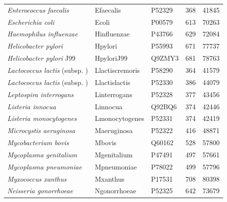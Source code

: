 \begin{table}
\begin{minipage}[c]{\textwidth}
\begin{narrow}{-1in}{-1in}
\begin{small}
\begin{tabular}{@{}llllp{.7in}@{}}
{\it Enterococcus faecalis} &  Efaecalis &     P52329 &        368 &      41845 \\

{\it Escherichia coli} &      Ecoli &     P00579 &        613 &      70263 \\

{\it Haemophilus influenzae} & Hinfluenzae &     P43766 &        629 &      72084 \\

{\it Helicobacter pylori} &    Hpylori &     P55993 &        671 &      77737 \\

{\it Helicobacter pylori} J99  & HpyloriJ99 &     Q9ZMY3 &        681 &      78763 \\

{\it Lactococcus lactis} (subsp. \e{cremoris}) & Llactiscremoris &     P58290 &        364 &      41579 \\

{\it Lactococcus lactis} (subsp. \e{lactis})  & Llactislactis &     P52330 &        386 &      44079 \\

{\it Leptospira interrogans} & Linterrogans &     P52328 &        377 &      43456 \\

{\it Listeria innocua} &   Linnocua &     Q92BQ6 &        374 &      42446 \\

{\it Listeria monocytogenes} & Lmonocytogenes &     P52331 &        374 &      42419 \\

{\it Microcystis aeruginosa} & Maeruginosa &     P52322 &        416 &      48871 \\

{\it Mycobacterium bovis} &     Mbovis &     Q60162 &        528 &      57800 \\

{\it Mycoplasma genitalium} & Mgenitalium &     P47491 &        497 &      57661 \\

{\it Mycoplasma pneumoniae} & Mpneumoniae &     P78022 &        499 &      57796 \\

{\it Myxococcus xanthus} &   Mxanthus &     P17531 &        708 &      80398 \\

{\it Neisseria gonorrhoeae} & Ngonorrhoeae &     P52325 &        642 &      73679 \\


\end{tabular}
\end{small}
\end{narrow}
\end{minipage}
\end{table}
